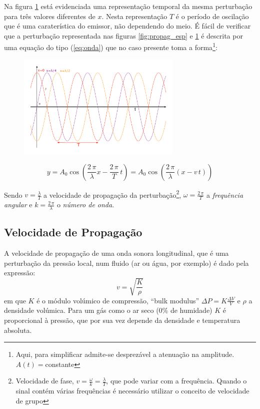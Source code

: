 \documentclass[a4paper,12pt]{article}      %
\begin{document}
Na figura \ref{fig:propag_tempo} está evidenciada uma representação temporal da mesma perturbação para três valores diferentes de $x$. Nesta representação $T$ é o período de oscilação que é uma caraterística do emissor, não dependendo do meio. É fácil de verificar que a perturbação representada nas figuras \ref{fig:propag_esp} e \ref{fig:propag_tempo} é descrita por uma equação do tipo (\ref{eq:onda}) que no caso presente toma a forma\footnote{Aqui, para simplificar admite-se desprezável a atenuação na amplitude. $A(t)=$constante}:

\begin{figure} [!htbp] 
	\centering 
	\includegraphics[width=0.7\textwidth]{propag_tempo} 
	\caption{\label{fig:propag_tempo}} 
\end{figure}

\begin{equation}
	\label{eq:onda3}
	y= A_0 \cos  \left(\frac{2\, \pi }{\lambda} x - \frac{2\,\pi }{T}\, t  \right) = 
	 A_0 \cos  \left( \frac{2\, \pi }{\lambda} (x- v\,t)  \right) 
\end{equation}


Sendo $v=\frac{\lambda }{T}$ a velocidade de propagação da perturbação\footnote{Velocidade de fase,  $v=\frac{\omega}{k} = \frac{\lambda}{T}$, que pode variar com a frequência. Quando o sinal contém várias frequências é necessário utilizar o conceito de velocidade de grupo}, $\omega=\frac{2\, \pi }{T}$ a \emph{frequência angular} e $k=\frac{2\, \pi }{\lambda}$ o \emph{número de onda}.

\subsection{\sf Velocidade de Propagação}

A velocidade de propagação de uma onda sonora longitudinal, que é uma perturbação da pressão local,  num fluido (ar ou água, por exemplo) é dado pela expressão:   
\begin{equation}
	\label{eq:veloc}
	v = \sqrt{\frac{K}{\rho}}
\end{equation}
em que $K$ é o módulo volúmico de compressão, “bulk modulus” $\Delta P= K \frac{\Delta V}{V}$ e $\rho$ a densidade volúmica. Para um gás como o 
ar seco (0\% de humidade) $K$ é proporcional à pressão, que por sua vez depende da densidade e temperatura absoluta.
\end{document}
